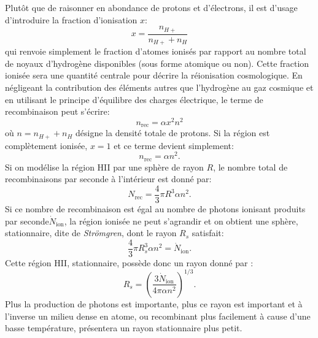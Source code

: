 Plutôt que de raisonner en abondance de protons et d'électrons, il est d'usage d'introduire la fraction d'ionisation $x$:
\begin{equation}
x=\frac{n_{H+}}{n_{H+}+n_H}
\end{equation}
qui renvoie simplement le fraction d'atomes ionisés par rapport au nombre total de noyaux d'hydrogène disponibles (sous forme atomique ou non). Cette fraction ionisée sera une quantité centrale pour décrire la réionisation cosmologique. En négligeant la contribution des éléments autres que l'hydrogène au gaz cosmique et en utilisant le principe d'équilibre des charges électrique, le terme de recombinaison peut s'écrire:
\begin{equation}
n_\mathrm{rec}=\alpha x^2 n^2
\end{equation}
où $n=n_{H+}+n_H$ désigne la densité totale de protons. Si la région est complètement ionisée, $x=1$ et ce terme devient simplement:
\begin{equation}
n_\mathrm{rec}=\alpha n^2.
\end{equation}
Si on modélise la région HII par une sphère de rayon $R$, le nombre total de recombinaisons par seconde à l'intérieur est donné par:
\begin{equation}
N_\mathrm{rec}=\frac{4}{3}\pi R^3\alpha n^2.
\end{equation}
Si ce nombre de recombinaison est égal au nombre de photons ionisant produits par seconde$ \dot N_\mathrm{ion}$, la région ionisée ne peut s'agrandir et on obtient une sphère, stationnaire, dite de \textit{Strömgren}, dont le rayon $R_s$ satisfait:
\begin{equation}
\frac{4}{3}\pi R_s^3\alpha n^2=\dot N_\mathrm{ion}.
\end{equation}
Cette région HII, stationnaire, possède donc un rayon donné par :
\begin{equation}
R_s=\left(\frac{3 \dot N_\mathrm{ion}}{4\pi \alpha n^2}\right)^{1/3}.
\end{equation}
Plus la production de photons est importante, plus ce rayon est important et à l'inverse un milieu dense en atome, ou recombinant plus facilement à cause d'une basse température, présentera un rayon stationnaire plus petit.

